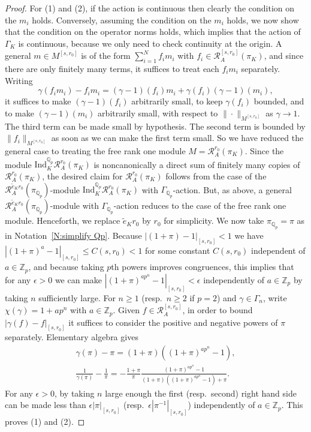 \documentclass[12pt]{article}
\theoremstyle{definition}
\numberwithin{equation}{theorem}
\newcommand{\calR}{\mathcal{R}}
\newcommand{\QQ}{\mathbb{Q}}
\newcommand{\ZZ}{\mathbb{Z}}
\newcommand{\Ind}{\mathrm{Ind}}
\def\Qp{\QQ_p}
\newcommand{\Zp}{\ZZ_p}
\begin{document}
\begin{proof}
For (1) and (2), if the action is continuous then clearly the
condition on the $m_i$ holds.  Conversely, assuming the condition on
the $m_i$ holds, we now show that the condition on the operator norms
holds, which implies that the action of $\Gamma_K$ is continuous,
because we only need to check continuity at the origin.  A general $m
\in M^{[s,r_0]}$ is of the form $\sum_{i=1}^N f_im_i$ with $f_i \in
\calR_A^{[s,r_0]}(\pi_K)$, and since there are only finitely many
terms, it suffices to treat each $f_im_i$ separately.  Writing
\[
\gamma(f_im_i)-f_im_i = (\gamma-1)(f_i)m_i+\gamma(f_i)(\gamma-1)(m_i),
\]
it suffices to make $(\gamma-1)(f_i)$ arbitrarily small, to keep
$\gamma(f_i)$ bounded, and to make $(\gamma-1)(m_i)$ arbitrarily
small, with respect to $\|\cdot\|_{M^{[s,r_0]}}$ as $\gamma \to 1$.
The third term can be made small by hypothesis.  The second term is
bounded by $\|f_i\|_{M^{[s,r_0]}}$ as soon as we can make the first
term small.  So we have reduced the general case to treating the free
rank one module $M = \calR_A^{r_0}(\pi_K)$.  Since the module
$\Ind_K^{\Qp} \calR_A^{r_0}(\pi_K)$ is noncanonically a direct sum of
finitely many copies of $\calR_A^{r_0}(\pi_K)$, the desired claim for
$\calR_A^{r_0}(\pi_K)$ follows from the case of the $\calR_A^{\tilde
  e_K r_0}(\pi_{\Qp})$-module $\Ind_K^{\Qp} \calR_A^{r_0}(\pi_K)$ with
$\Gamma_{\Qp}$-action.  But, as above, a general $\calR_A^{\tilde e_K
  r_0}(\pi_{\Qp})$-module with $\Gamma_{\Qp}$-action reduces to the
case of the free rank one module.  Henceforth, we replace $\tilde e_K
r_0$ by $r_0$ for simplicity.  We now take $\pi_{\Qp} = \pi$ as in
Notation~\ref{N:simplify Qp}.  Because $|(1+\pi)-1|_{[s,r_0]} < 1$ we
have $|(1+\pi)^a-1|_{[s,r_0]} \leq C(s,r_0) < 1$ for some constant
$C(s,r_0)$ independent of $a \in \Zp$, and because taking $p$th powers
improves congruences, this implies that for any $\epsilon>0$ we can
make $|(1+\pi)^{ap^n}-1|_{[s,r_0]}<\epsilon$ independently of $a \in
\Zp$ by taking $n$ sufficiently large.  For $n \geq 1$ (resp.\ $n \geq
2$ if $p=2$) and $\gamma \in \Gamma_n$, write $\chi(\gamma) = 1+ap^n$
with $a \in \Zp$.  Given $f \in \calR_A^{[s,r_0]}$, in order to bound
$|\gamma(f)-f|_{[s,r_0]}$ it suffices to consider the positive and
negative powers of $\pi$ separately.  Elementary algebra gives
\begin{gather}\label{E:pi estimates}
\gamma(\pi)-\pi
= (1+\pi)((1+\pi)^{ap^n}-1), \\
\nonumber
\frac1{\gamma(\pi)} - \frac1\pi
= -\frac{1+\pi}{\pi}
   \frac{(1+\pi)^{ap^n}-1}{(1+\pi)((1+\pi)^{ap^n}-1)+\pi}.
\end{gather}
For any $\epsilon>0$, by taking $n$ large enough the first
(resp.\ second) right hand side can be made less than $\epsilon
|\pi|_{[s,r_0]}$ (resp.\ $\epsilon |\pi^{-1}|_{[s,r_0]}$)
independently of $a \in \Zp$.  This proves (1) and (2).


\end{proof}
\end{document}
